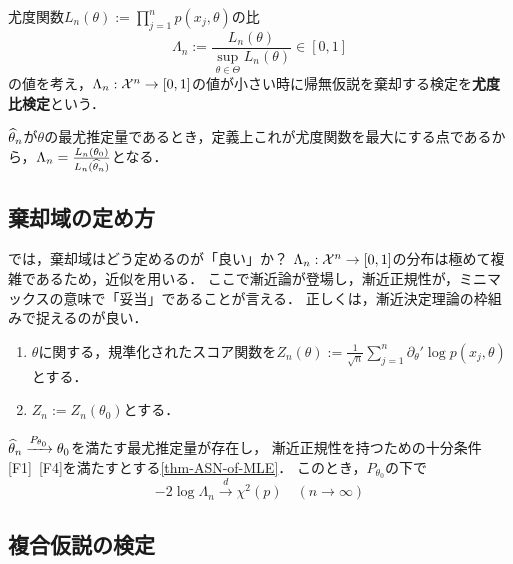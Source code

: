 \documentclass[uplatex,dvipdfmx]{jsreport}
\begin{document}
\begin{definition}
    尤度関数$L_n(\theta):=\prod^n_{j=1}p(x_j,\theta)$の比
    \[\Lambda_n:=\frac{L_n(\theta)}{\sup_{\theta\in\Theta}L_n(\theta)}\in[0,1]\]
    の値を考え，$\Lambda_n:\mathcal{X}^n\to[0,1]$の値が小さい時に帰無仮説を棄却する検定を\textbf{尤度比検定}という．
\end{definition}
\begin{remark}
    $\widehat{\theta}_n$が$\theta$の最尤推定量であるとき，定義上これが尤度関数を最大にする点であるから，$\Lambda_n=\frac{L_n(\theta_0)}{L_n(\widehat{\theta}_n)}$となる．
\end{remark}

\subsection{棄却域の定め方}

\begin{tcolorbox}[colframe=ForestGreen, colback=ForestGreen!10!white,breakable,colbacktitle=ForestGreen!40!white,coltitle=black,fonttitle=\bfseries\sffamily,
title=]
    では，棄却域はどう定めるのが「良い」か？
    $\Lambda_n:\mathcal{X}^n\to[0,1]$の分布は極めて複雑であるため，近似を用いる．
    ここで漸近論が登場し，漸近正規性が，ミニマックスの意味で「妥当」であることが言える．
    正しくは，漸近決定理論の枠組みで捉えるのが良い．
\end{tcolorbox}

\begin{definition}\mbox{}
    \begin{enumerate}
        \item $\theta$に関する，規準化されたスコア関数を$Z_n(\theta):=\frac{1}{\sqrt{n}}\sum^n_{j=1}\partial_\theta'\log p(x_j,\theta)$とする．
        \item $Z_n:=Z_n(\theta_0)$とする．
    \end{enumerate}
\end{definition}

\begin{theorem}
    $\widehat{\theta}_n\xrightarrow{P_{\theta_0}}\theta_0$を満たす最尤推定量が存在し，
    漸近正規性を持つための十分条件[F1]~[F4]を満たすとする\ref{thm-ASN-of-MLE}．
    このとき，$P_{\theta_0}$の下で
    \[-2\log\Lambda_n\xrightarrow{d}\chi^2(p)\quad(n\to\infty)\]
\end{theorem}

\subsection{複合仮説の検定}
\end{document}
